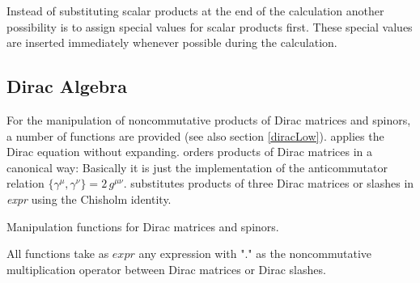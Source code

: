 Instead of substituting scalar products at the end of the calculation 
another possibility is to assign special values for
scalar products first. These special values are inserted immediately 
whenever possible during the calculation.
\beom
{}
\enom

\subsection{Dirac Algebra}
\label{diracalg}

For the manipulation of noncommutative products of Dirac matrices and
spinors, a number of functions are provided (see also section \ref{diracLow}).
 applies the Dirac equation without expanding.
 orders products of Dirac matrices in a canonical way:
Basically it is just the implementation of the anticommutator relation $\{\gamma^{\mu}, \gamma^{\nu}\} = 2 \, g^{\mu \nu}$.
 substitutes products of three Dirac matrices or slashes in {\sl expr} using the Chisholm identity.

 {Manipulation functions for Dirac matrices and spinors.}

All functions take as $expr$
any expression with "." as the noncommutative multiplication operator between
Dirac matrices or Dirac slashes.

\beom

